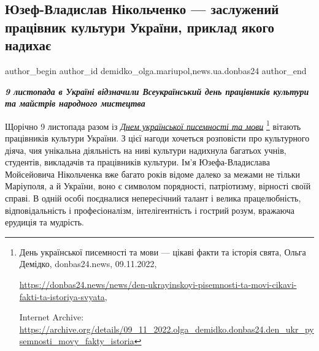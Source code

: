  
 
 
 
 
 
\subsection{Юзеф-Владислав Нікольченко — заслужений працівник культури України, приклад якого надихає}
\label{sec:09_11_2022.stz.news.ua.donbas24.1.juzef_vladislav_nikolchenko_pryklad_nadyhaje}
 
\ifcmt
 author_begin
   author_id demidko_olga.mariupol,news.ua.donbas24
 author_end
\fi

\begin{center}
  \em\color{blue}\bfseries\Large
9 листопада в Україні відзначили Всеукраїнський день працівників культури та майстрів народного мистецтва
\end{center}

Щорічно 9 листопада разом із \href{https://archive.org/details/09_11_2022.olga_demidko.donbas24.den_ukr_pysemnosti_movy_fakty_istoria}{\emph{Днем української писемності та мови}}%
\footnote{День української писемності та мови — цікаві факти та історія свята, Ольга Демідко, donbas24.news, 09.11.2022, \par%
\url{https://donbas24.news/news/den-ukrayinskoyi-pisemnosti-ta-movi-cikavi-fakti-ta-istoriya-svyata}, \par%
Internet Archive: \url{https://archive.org/details/09_11_2022.olga_demidko.donbas24.den_ukr_pysemnosti_movy_fakty_istoria}%
} вітають працівників культури України. З цієї нагоди хочеться розповісти про культурного
діяча, чия унікальна діяльність на ниві культури надихнула багатьох учнів,
студентів, викладачів та працівників культури. Ім'я Юзефа-Владислава
Мойсейовича Нікольченка вже багато років відоме далеко за межами не тільки
Маріуполя, а й України, воно є символом порядності, патріотизму, вірності своїй
справі. В одній особі поєдналися непересічний талант і велика працелюбність,
відповідальність і професіоналізм, інтелігентність і гострий розум, вражаюча
ерудиція та мудрість.

